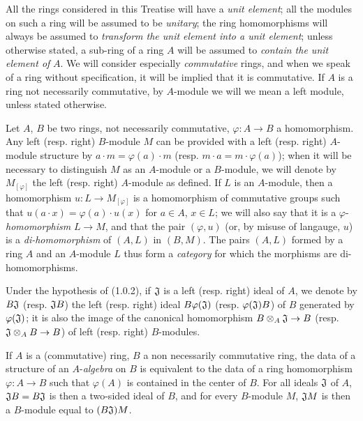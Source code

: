 \documentclass[../main.tex]{subfiles}
\begin{document}
\begin{cx}[1.0.1]
All the rings considered in this Treatise will have a \emph{unit element}; all the modules
on such a ring will be assumed to be \emph{unitary}; the ring homomorphisms will always be
assumed to \emph{transform the unit element into a unit element}; unless otherwise stated,
a sub-ring of a ring $A$ will be assumed to \emph{contain the unit element of} $A$. We will
consider especially \emph{commutative} rings, and when we speak of a ring without
specification, it
will be implied that it is commutative. If $A$ is a ring not necessarily commutative, by
$A$-module we will we mean a left module, unless stated otherwise.
\end{cx}

\begin{cx}[1.0.2]
Let $A$, $B$ be two rings, not necessarily commutative, $\varphi:A\to B$ a homomorphism.
Any left (resp. right) $B$-module $M$ can be provided with a left (resp. right) $A$-module
structure by $a\cdot m=\varphi(a)\cdot m$ (resp. $m\cdot a=m\cdot\varphi(a)$); when it will
be necessary to distinguish $M$ as an $A$-module or a $B$-module, we will denote by
$M_{[\varphi]}$ the left (resp. right) $A$-module as defined. If $L$ is an $A$-module, then
a homomorphism $u:L\to M_{[\varphi]}$ is a homomorphism of commutative groups such that
$u(a\cdot x)=\varphi(a)\cdot u(x)$ for $a\in A$, $x\in L$; we will also say that it is a
$\varphi$-\emph{homomorphism} $L\to M$,
and that the pair $(\varphi,u)$ (or, by misuse of langauge, $u$)
is a \emph{di-homomorphism} of $(A,L)$ in $(B,M)$. The pairs $(A,L)$ formed by a ring $A$
and an $A$-module $L$ thus form a \emph{category} for which the morphisms are
di-homomorphisms.
\end{cx}

\begin{cx}[1.0.3]
Under the hypothesis of (1.0.2), if $\mathfrak{J}$ is a left (resp. right) ideal of $A$, we
denote by $B\mathfrak{J}$ (resp. $\mathfrak{J}B$) the left (resp. right) ideal $B\varphi(\mathfrak{J})$
(resp. $\varphi(\mathfrak{J})B$) of $B$ generated by $\varphi(\mathfrak{J})$; it is also the image
of the canonical homomorphism $B\otimes_A\mathfrak{J}\to B$ (resp. $\mathfrak{J}\otimes_A B\to B$)
of left (resp. right) $B$-modules.
\end{cx}

\begin{cx}[1.0.4]
If $A$ is a (commutative) ring, $B$ a non necessarily commutative ring, the data of
a structure of an $A$-\emph{algebra} on $B$ is equivalent to the data of a ring
homomorphism $\varphi:A\to B$ such that $\varphi(A)$ is contained in the center of $B$.
For all ideals $\mathfrak{J}$ of $A$, $\mathfrak{J}B=B\mathfrak{J}$ is then a two-sided ideal of $B$, and
for every $B$-module $M$, $\mathfrak{J}M$ is then a $B$-module equal to $(B\mathfrak{J})M$.
\end{cx}
\end{document}
